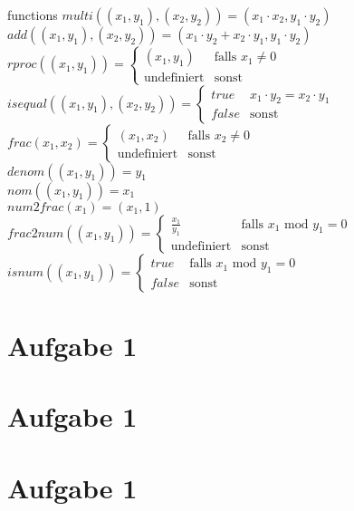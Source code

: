 \documentclass[12pt, twoside]{article}
\begin{document}
\begin{tabbing}
functions   \> $multi((x_1, y_1), (x_2, y_2)) = (x_1 \cdot x_2, y_1 \cdot y_2)$                 \\
            \> $add((x_1, y_1), (x_2, y_2)) = (x_1 \cdot y_2 + x_2 \cdot y_1, y_1 \cdot y_2)$   \\
            \> $rproc((x_1, y_1))=\begin{cases}
            (x_1, y_1) & \text{falls } x_1 \not = 0 \\
            \text{undefiniert} & \text{sonst}            
            \end{cases}$ \\
            \> $isequal((x_1, y_1), (x_2, y_2)) = 
            \begin{cases}
            true & x_1 \cdot y_2 = x_2 \cdot y_1 \\
            false & \text{sonst}
            \end{cases}$ \\
            \> $frac(x_1, x_2) = \begin{cases}
            (x_1, x_2) & \text{falls } x_2 \not = 0 \\
            \text{undefiniert} & \text{sonst}
            \end{cases}$ \\
            \> $denom((x_1, y_1)) = y_1$ \\
            \> $nom((x_1, y_1)) = x_1$ \\
            \> $num2frac(x_1) = (x_1, 1)$ \\
            \> $frac2num((x_1, y_1)) = \begin{cases}
            \frac{x_1}{y_1} & \text{falls }  x_1  \text{ mod }  y_1 = 0 \\
            \text{undefiniert}     & \text{sonst}
            \end{cases}$ \\
            \> $isnum((x_1, y_1)) = \begin{cases}
            true & \text{falls } x_1 \text{ mod } y_1 = 0 \\
            false & \text{sonst}
            \end{cases}
            $ \\


 \end{tabbing}

\section{Aufgabe 1}

\section{Aufgabe 1}

\section{Aufgabe 1}
\end{document}
